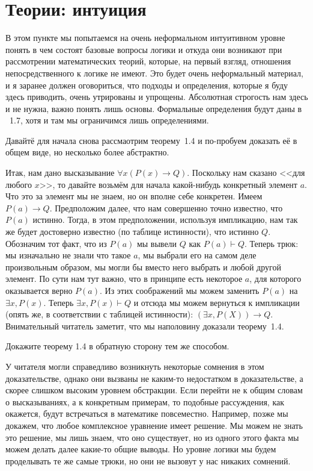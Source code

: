 \section{Теории: интуиция}

В этом пункте мы попытаемся на очень неформальном интуитивном уровне понять в чем состоят базовые вопросы логики и откуда они возникают при рассмотрении математических теорий, которые, на первый взгляд, отношения непосредственного к логике не имеют. Это будет очень неформальный материал, и я заранее должен оговориться, что подходы и определения, которые я буду здесь приводить, очень утрированы и упрощены. Абсолютная строгость нам здесь и не нужна, важно понять лишь основы. Формальные определения будут даны в \textsection~1.7, хотя и там мы ограничимся лишь определениями.

Давайтё для начала снова рассмаотрим теорему~1.4 и по-пробуем доказать её в общем виде, но несколько более абстрактно.

Итак, нам дано высказывание $\forall x (P(x)\to Q)$. Поскольку нам сказано <<для любого $x$>>, то давайте возьмём для начала какой-нибудь конкретный элемент $a$. Что это за элемент мы не знаем, но он вполне себе конкретен. Имеем $P(a)\to Q$. Предположим далее, что нам совершенно точно известно, что $P(a)$ истинно. Тогда, в этом предположении, используя импликацию, нам так же будет достоверно известно (по таблице истинности), что истинно $Q$. Обозначим тот факт, что из $P(a)$ мы вывели $Q$ как $P(a)\vdash Q$. Теперь трюк: мы изначально не знали что такое $a$, мы выбрали его на самом деле произвольным образом, мы могли бы вместо него выбрать и любой другой элемент. По сути нам тут важно, что  в принципе есть некоторое $a$, для которого оказывается верно $P(a)$. Из этих соображений мы можем заменить $P(a)$ на $\exists x, P(x)$. Теперь $\exists x, P(x) \vdash Q$ и отсюда мы можем вернуться к импликации (опять же, в соответствии с таблицей истинности): $(\exists x, P(X))\to Q$. Внимательный читатель заметит, что мы наполовину доказали теорему~1.4.

\begin{exercise}
Докажите теорему 1.4 в обратную сторону тем же способом.
\end{exercise}

У читателя могли справедливо возникнуть некоторые сомнения в этом доказательстве, однако они вызваны не каким-то недостатком в доказательстве, а скорее слишком высоким уровнем обстракции. Если перейти не к общим словам о высказываниях, а к конкретным примерам, то подобные рассуждения, как окажется, будут встречаться в математике повсеместно. Например, позже мы докажем, что любое комплексное уравнение имеет решение. Мы можем не знать это решение, мы лишь знаем, что оно существует, но из одного этого факта мы можем делать далее какие-то общие выводы. Но уровне логики мы будем проделывать те же самые трюки, но они не вызовут у нас никаких сомнений.

